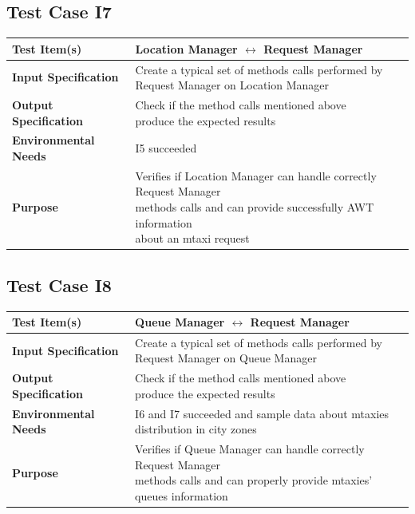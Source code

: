 \documentclass[11pt,titlepage]{article} %
\begin{document}
  \subsection{Test Case I7}
  \begin{table}[H]
    \begin{tabular*}{16cm}{ll}
	\hline
	\textbf{Test Item(s)} & Location Manager $ \longleftrightarrow $ Request Manager \\
	\hline
	\textbf{Input Specification} & \pbox{20cm}{Create a typical set of methods calls performed by \\ Request Manager on Location Manager}\\
	\hline
	\textbf{Output Specification} & \pbox{20cm}{Check if the method calls mentioned above \\ produce the expected results} \\
	\hline
	\textbf{Environmental Needs} & I5 succeeded \\
	\hline
	\textbf{Purpose} & \pbox{20cm}{Verifies if Location Manager can handle correctly Request Manager \\methods calls 
					and can provide successfully AWT information \\ about an mtaxi request} \\
	\hline
    \end{tabular*}
  \end{table}
  
  \subsection{Test Case I8}
  \begin{table}[H]
    \begin{tabular*}{16cm}{ll}
	\hline
	\textbf{Test Item(s)} & Queue Manager $ \longleftrightarrow $ Request Manager \\
	\hline
	\textbf{Input Specification} &  \pbox{20cm}{Create a typical set of methods calls performed by \\ Request Manager on Queue Manager} \\
	\hline
	\textbf{Output Specification} & \pbox{20cm}{Check if the method calls mentioned above \\ produce the expected results} \\
	\hline
	\textbf{Environmental Needs} & \pbox{20cm}{I6 and I7 succeeded and sample data about mtaxies \\ distribution in city zones}\\
	\hline
	\textbf{Purpose} & \pbox{20cm}{Verifies if Queue Manager can handle correctly Request Manager \\ methods calls 
					and can properly provide mtaxies' queues information} \\
	\hline
    \end{tabular*}
  \end{table}
  
\end{document}
